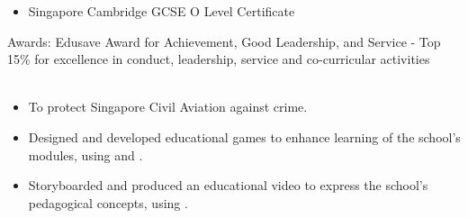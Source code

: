 \documentclass[a4paper,10pt]{article}
\begin{document}
\begin{center}
\begin{minipage}{1\textwidth}
      \begin{itemize}[left=0pt, labelsep=0.5em, itemsep=0pt, topsep=0pt, parsep=0pt, partopsep=0pt]
        \item \small\lato Singapore Cambridge GCSE O Level Certificate
      \end{itemize}
      \small\latobold Awards: \lato Edusave Award for Achievement, Good Leadership, and Service - Top 15\% for excellence in conduct, leadership, service and co-curricular activities\\

      \normalsize\noindent{}\\[-0.25cm]
      \makebox[\linewidth]{\rule{1.02\linewidth}{0.3pt}}

      \noindent
      \hfill
      \hfill

      \vspace{0.15cm}

      \begin{itemize}[left=0pt, labelsep=0.5em, itemsep=0pt, topsep=0pt, parsep=0pt, partopsep=0pt]
        \item \small\lato To protect Singapore Civil Aviation against crime.
      \end{itemize}

      \vspace{0.25cm}

      \noindent
      \hfill
      \hfill

      \vspace{0.15cm}

      \begin{itemize}[left=0pt, labelsep=0.5em, itemsep=0pt, topsep=0pt, parsep=0pt, partopsep=0pt]
        \item \small\lato Designed and developed educational games to enhance learning of the school's modules, using  \lato and .
        \item \small\lato Storyboarded and produced an educational video to express the school's pedagogical concepts, using .\\
      \end{itemize}


\end{minipage}
\end{center}
\end{document}
